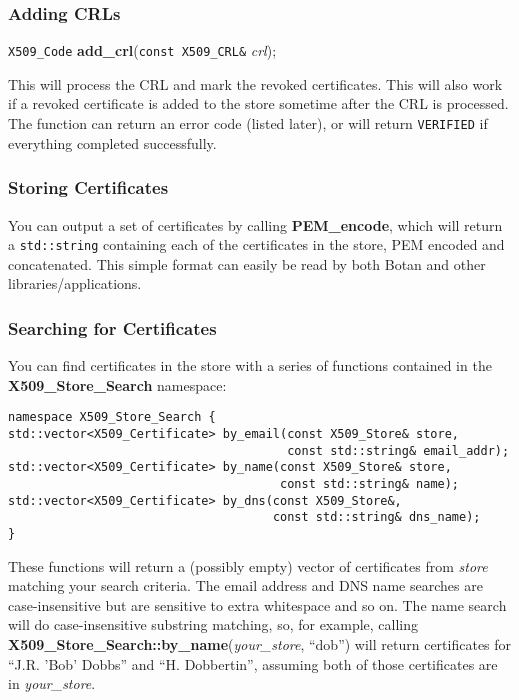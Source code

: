 \documentclass{article}
\newcommand{\function}[1]{\textbf{#1}}
\newcommand{\type}[1]{\texttt{#1}}
\renewcommand{\arg}[1]{\textsl{#1}}
\begin{document}
\subsubsection{Adding CRLs}

\type{X509\_Code} \function{add\_crl}(\type{const X509\_CRL\&} \arg{crl});

This will process the CRL and mark the revoked certificates. This will also
work if a revoked certificate is added to the store sometime after the CRL is
processed. The function can return an error code (listed later), or will return
\type{VERIFIED} if everything completed successfully.

\subsubsection{Storing Certificates}

You can output a set of certificates by calling \function{PEM\_encode}, which
will return a \type{std::string} containing each of the certificates in the
store, PEM encoded and concatenated. This simple format can easily be read by
both Botan and other libraries/applications.

\subsubsection{Searching for Certificates}

You can find certificates in the store with a series of functions contained
in the \function{X509\_Store\_Search} namespace:

\begin{verbatim}
namespace X509_Store_Search {
std::vector<X509_Certificate> by_email(const X509_Store& store,
                                       const std::string& email_addr);
std::vector<X509_Certificate> by_name(const X509_Store& store,
                                      const std::string& name);
std::vector<X509_Certificate> by_dns(const X509_Store&,
                                     const std::string& dns_name);
}
\end{verbatim}

These functions will return a (possibly empty) vector of certificates from
\arg{store} matching your search criteria. The email address and DNS name
searches are case-insensitive but are sensitive to extra whitespace and so
on. The name search will do case-insensitive substring matching, so, for
example, calling \function{X509\_Store\_Search::by\_name}(\arg{your\_store},
``dob'') will return certificates for ``J.R. 'Bob' Dobbs'' and
``H. Dobbertin'', assuming both of those certificates are in \arg{your\_store}.
\end{document}
